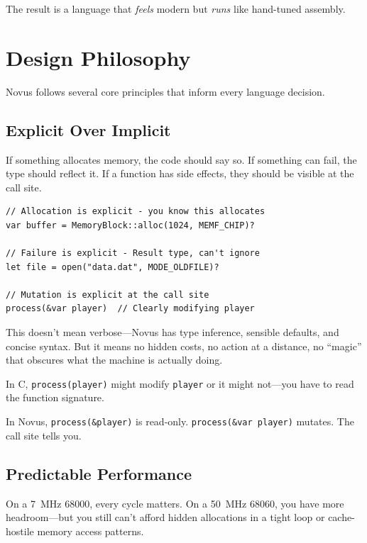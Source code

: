 The result is a language that \emph{feels} modern but \emph{runs} like hand-tuned assembly.

\section{Design Philosophy}

Novus follows several core principles that inform every language decision.

\subsection{Explicit Over Implicit}

If something allocates memory, the code should say so. If something can fail, the type should reflect it. If a function has side effects, they should be visible at the call site.

\begin{lstlisting}
// Allocation is explicit - you know this allocates
var buffer = MemoryBlock::alloc(1024, MEMF_CHIP)?

// Failure is explicit - Result type, can't ignore
let file = open("data.dat", MODE_OLDFILE)?

// Mutation is explicit at the call site
process(&var player)  // Clearly modifying player
\end{lstlisting}

This doesn't mean verbose---Novus has type inference, sensible defaults, and concise syntax. But it means no hidden costs, no action at a distance, no ``magic'' that obscures what the machine is actually doing.

\begin{comingfromc}
In C, \texttt{process(player)} might modify \texttt{player} or it might not---you have to read the function signature.

In Novus, \texttt{process(\&player)} is read-only. \texttt{process(\&var player)} mutates. The call site tells you.
\end{comingfromc}

\subsection{Predictable Performance}

On a 7~MHz 68000, every cycle matters. On a 50~MHz 68060, you have more headroom---but you still can't afford hidden allocations in a tight loop or cache-hostile memory access patterns.

